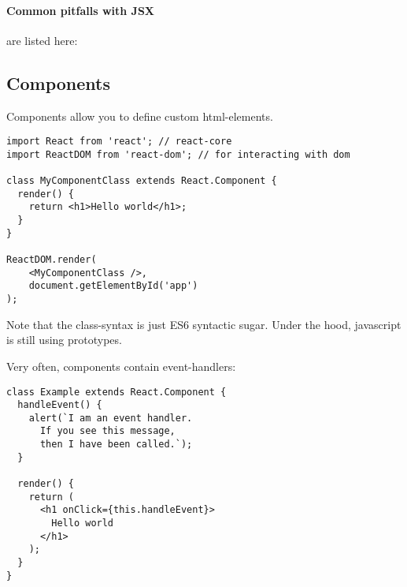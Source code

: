 \paragraph{Common pitfalls with JSX} are listed here: 


\subsection{Components}
Components allow you to define custom html-elements. 
\begin{lstlisting}
import React from 'react'; // react-core
import ReactDOM from 'react-dom'; // for interacting with dom

class MyComponentClass extends React.Component {
  render() {
    return <h1>Hello world</h1>;
  }
}

ReactDOM.render(
	<MyComponentClass />, 
	document.getElementById('app')
);
\end{lstlisting}
Note that the  class-syntax is just ES6 syntactic sugar. Under the hood, javascript is still using prototypes.

Very often, components contain event-handlers:
\begin{lstlisting}
class Example extends React.Component {
  handleEvent() {
    alert(`I am an event handler.
      If you see this message,
      then I have been called.`);
  }

  render() {
    return (
      <h1 onClick={this.handleEvent}>
        Hello world
      </h1>
    );
  }
}
\end{lstlisting}

